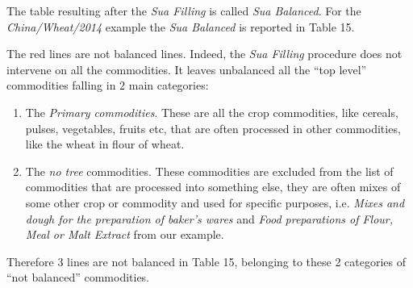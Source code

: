 \documentclass[]{article}
\providecommand{\tightlist}{%
  \setlength{\itemsep}{0pt}\setlength{\parskip}{0pt}}
\begin{document}
The table resulting after the \emph{Sua Filling} is called \emph{Sua
Balanced}. For the \emph{China/Wheat/2014} example the \emph{Sua
Balanced} is reported in Table 15.

The red lines are not balanced lines. Indeed, the \emph{Sua Filling}
procedure does not intervene on all the commodities. It leaves
unbalanced all the ``top level'' commodities falling in 2 main
categories:

\begin{enumerate}
\def\labelenumi{\arabic{enumi}.}
\tightlist
\item
  The \emph{Primary commodities}. These are all the crop commodities,
  like cereals, pulses, vegetables, fruits etc, that are often processed
  in other commodities, like the wheat in flour of wheat.
\item
  The \emph{no tree} commodities. These commodities are excluded from
  the list of commodities that are processed into something else, they
  are often mixes of some other crop or commodity and used for specific
  purposes, i.e. \emph{Mixes and dough for the preparation of baker's
  wares} and \emph{Food preparations of Flour, Meal or Malt Extract}
  from our example.
\end{enumerate}

Therefore 3 lines are not balanced in Table 15, belonging to these 2
categories of ``not balanced'' commodities.
\end{document}
